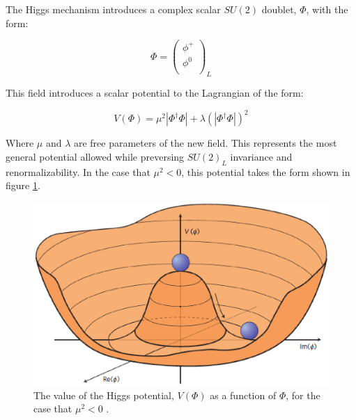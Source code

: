 The Higgs mechanism introduces a complex scalar $SU(2)$ doublet, $\Phi$, with the form:

\begin{equation}
  \label{eq:phiDoublet}
  \Phi = 
  \begin{pmatrix}                                                                                                           
    \phi^+ \\                                                                                                               
    \phi^0 \\                                                                                                                            
  \end{pmatrix}_L                                                                                                                    
\end{equation}

This field introduces a scalar potential to the Lagrangian of the form:

\begin{equation}
  \label{eq:higgsV}
  V(\Phi) = \mu^2|\Phi^\dagger\Phi| + \lambda (|\Phi^\dagger \Phi|)^2
\end{equation}

Where $\mu$ and $\lambda$ are free parameters of the new field. This represents the most general potential allowed while preversing $SU(2)_L$ invariance and renormalizability. In the case that $\mu^2 < 0$, this potential takes the form shown in figure \ref{fig:higgspotential}.

\begin{figure}[!htbp]
\centering
   \includegraphics[width=0.75\linewidth]{figures/theory/higgspotential.eps}
\caption{The value of the Higgs potential, $V(\Phi)$ as a function of $\Phi$, for the case that $\mu^2 < 0$ \cite{}.}
\label{fig:higgspotential}
\end{figure}

